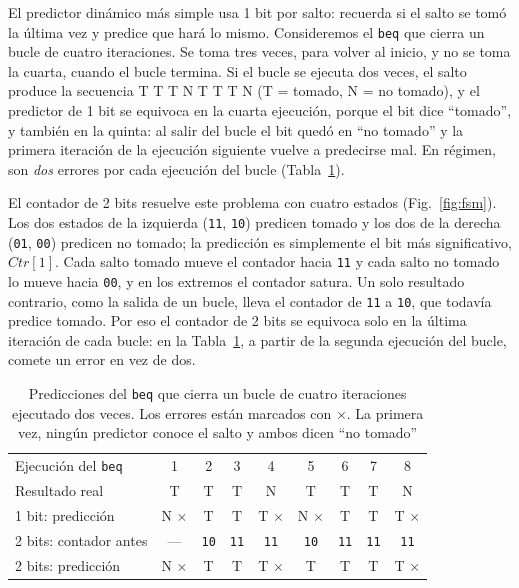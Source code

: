 \documentclass[11pt,a4paper]{article}
\newcommand{\sig}[1]{\textit{#1}}
\newcommand{\ins}[1]{\texttt{#1}}
\begin{document}
El predictor dinámico más simple usa 1 bit por salto: recuerda si el salto se tomó la
última vez y predice que hará lo mismo. Consideremos el \ins{beq} que cierra un bucle de
cuatro iteraciones. Se toma tres veces, para volver al inicio, y no se toma la cuarta, cuando
el bucle termina. Si el bucle se ejecuta dos veces, el salto produce la secuencia
\textsf{T T T N T T T N} (T = tomado, N = no tomado), y el predictor de 1 bit se equivoca en
la cuarta ejecución, porque el bit dice ``tomado'', y también en la quinta: al salir del bucle
el bit quedó en ``no tomado'' y la primera iteración de la ejecución siguiente vuelve a
predecirse mal. En régimen, son \emph{dos} errores por cada ejecución del bucle
(Tabla~\ref{tab:1v2}).

El contador de 2 bits resuelve este problema con cuatro estados
(Fig.~\ref{fig:fsm}). Los dos estados de la izquierda (\texttt{11}, \texttt{10})
predicen tomado y los dos de la derecha (\texttt{01}, \texttt{00}) predicen no tomado; la
predicción es simplemente el bit más significativo, $\sig{Ctr}[1]$. Cada salto tomado
mueve el contador hacia \texttt{11} y cada salto no tomado lo mueve hacia \texttt{00}, y en
los extremos el contador satura. Un solo resultado contrario, como la salida de un bucle,
lleva el contador de \texttt{11} a \texttt{10}, que todavía predice tomado. Por eso el
contador de 2 bits se equivoca solo en la última iteración de cada bucle: en la
Tabla~\ref{tab:1v2}, a partir de la segunda ejecución del bucle, comete un error en vez de
dos.

\begin{table}[htbp]
\centering\small
\caption{Predicciones del \ins{beq} que cierra un bucle de cuatro iteraciones ejecutado dos
veces. Los errores están marcados con $\times$. La primera vez, ningún predictor conoce el
salto y ambos dicen ``no tomado''}
\label{tab:1v2}
\begin{tabular}{@{}lcccccccc@{}}
\toprule
Ejecución del \ins{beq} & 1 & 2 & 3 & 4 & 5 & 6 & 7 & 8 \\
Resultado real          & T & T & T & N & T & T & T & N \\
\midrule
1 bit: predicción       & N $\times$ & T & T & T $\times$ & N $\times$ & T & T & T $\times$ \\
2 bits: contador antes  & --- & \texttt{10} & \texttt{11} & \texttt{11} & \texttt{10} & \texttt{11} & \texttt{11} & \texttt{11} \\
2 bits: predicción      & N $\times$ & T & T & T $\times$ & T & T & T & T $\times$ \\
\bottomrule
\end{tabular}
\end{table}
\end{document}
